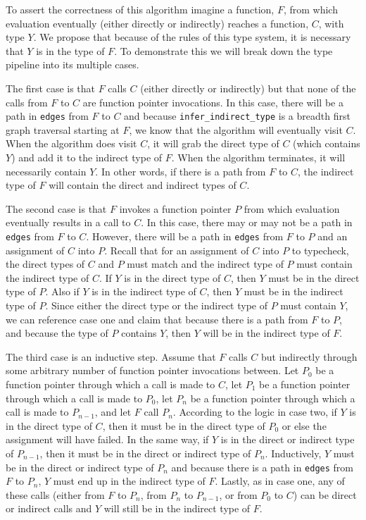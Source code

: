 To assert the correctness of this algorithm imagine a function, $F$, from which evaluation eventually (either directly or indirectly) reaches a function, $C$, with type $Y$.  We propose that because of the rules of this type system, it is necessary that $Y$ is in the type of $F$.  To demonstrate this we will break down the type pipeline into its multiple cases.

The first case is that $F$ calls $C$ (either directly or indirectly) but that none of the calls from $F$ to $C$ are function pointer invocations.  In this case, there will be a path in \lstinline{edges} from $F$ to $C$ and because \lstinline{infer_indirect_type} is a breadth first graph traversal starting at $F$, we know that the algorithm will eventually visit $C$.  When the algorithm does visit $C$, it will grab the direct type of $C$ (which contains $Y$) and add it to the indirect type of $F$.  When the algorithm terminates, it will necessarily contain $Y$.  In other words, if there is a path from $F$ to $C$, the indirect type of $F$ will contain the direct and indirect types of $C$.

The second case is that $F$ invokes a function pointer $P$ from which evaluation eventually results in a call to $C$.  In this case, there may or may not be a path in \lstinline{edges} from $F$ to $C$.  However, there will be a path in \lstinline{edges} from $F$ to $P$ and an assignment of $C$ into $P$.  Recall that for an assignment of $C$ into $P$ to typecheck, the direct types of $C$ and $P$ must match and the indirect type of $P$ must contain the indirect type of $C$.  If $Y$ is in the direct type of $C$, then $Y$ must be in the direct type of $P$.  Also if $Y$ is in the indirect type of $C$, then $Y$ must be in the indirect type of $P$.  Since either the direct type or the indirect type of $P$ must contain $Y$, we can reference case one and claim that because there is a path from $F$ to $P$, and because the type of $P$ contains $Y$, then $Y$ will be in the indirect type of $F$.  

The third case is an inductive step.  Assume that $F$ calls $C$ but indirectly through some arbitrary number of function pointer invocations between.  Let $P_0$ be a function pointer through which a call is made to $C$, let $P_1$ be a function pointer through which a call is made to $P_0$, let $P_n$ be a function pointer through which a call is made to $P_{n-1}$, and let $F$ call $P_n$.  According to the logic in case two, if $Y$ is in the direct type of $C$, then it must be in the direct type of $P_0$ or else the assignment will have failed.  In the same way, if $Y$ is in the direct or indirect type of $P_{n-1}$, then it must be in the direct or indirect type of $P_{n}$.  Inductively, $Y$ must be in the direct or indirect type of $P_n$ and because there is a path in \lstinline{edges} from $F$ to $P_n$, $Y$ must end up in the indirect type of $F$.  Lastly, as in case one, any of these calls (either from $F$ to $P_n$, from $P_n$ to $P_{n-1}$, or from $P_0$ to $C$) can be direct or indirect calls and $Y$ will still be in the indirect type of $F$.

